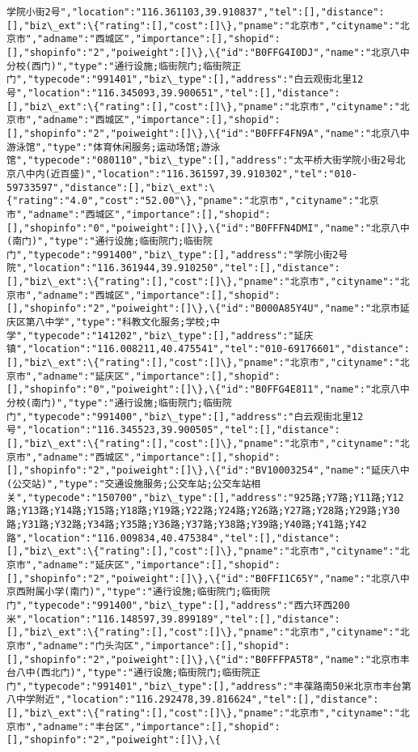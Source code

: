 \documentclass[11pt]{article}
\begin{document}
\begin{Verbatim}[commandchars=\\\{\}]
学院小街2号","location":"116.361103,39.910837","tel":[],"distance":[],"biz\_ext":\{"rating":[],"cost":[]\},"pname":"北京市","cityname":"北京市","adname":"西城区","importance":[],"shopid":[],"shopinfo":"2","poiweight":[]\},\{"id":"B0FFG4I0DJ","name":"北京八中分校(西门)","type":"通行设施;临街院门;临街院正门","typecode":"991401","biz\_type":[],"address":"白云观街北里12号","location":"116.345093,39.900651","tel":[],"distance":[],"biz\_ext":\{"rating":[],"cost":[]\},"pname":"北京市","cityname":"北京市","adname":"西城区","importance":[],"shopid":[],"shopinfo":"2","poiweight":[]\},\{"id":"B0FFF4FN9A","name":"北京八中游泳馆","type":"体育休闲服务;运动场馆;游泳馆","typecode":"080110","biz\_type":[],"address":"太平桥大街学院小街2号北京八中内(近百盛)","location":"116.361597,39.910302","tel":"010-59733597","distance":[],"biz\_ext":\{"rating":"4.0","cost":"52.00"\},"pname":"北京市","cityname":"北京市","adname":"西城区","importance":[],"shopid":[],"shopinfo":"0","poiweight":[]\},\{"id":"B0FFFN4DMI","name":"北京八中(南门)","type":"通行设施;临街院门;临街院门","typecode":"991400","biz\_type":[],"address":"学院小街2号院","location":"116.361944,39.910250","tel":[],"distance":[],"biz\_ext":\{"rating":[],"cost":[]\},"pname":"北京市","cityname":"北京市","adname":"西城区","importance":[],"shopid":[],"shopinfo":"2","poiweight":[]\},\{"id":"B000A85Y4U","name":"北京市延庆区第八中学","type":"科教文化服务;学校;中学","typecode":"141202","biz\_type":[],"address":"延庆镇","location":"116.008211,40.475541","tel":"010-69176601","distance":[],"biz\_ext":\{"rating":[],"cost":[]\},"pname":"北京市","cityname":"北京市","adname":"延庆区","importance":[],"shopid":[],"shopinfo":"0","poiweight":[]\},\{"id":"B0FFG4E811","name":"北京八中分校(南门)","type":"通行设施;临街院门;临街院门","typecode":"991400","biz\_type":[],"address":"白云观街北里12号","location":"116.345523,39.900505","tel":[],"distance":[],"biz\_ext":\{"rating":[],"cost":[]\},"pname":"北京市","cityname":"北京市","adname":"西城区","importance":[],"shopid":[],"shopinfo":"2","poiweight":[]\},\{"id":"BV10003254","name":"延庆八中(公交站)","type":"交通设施服务;公交车站;公交车站相关","typecode":"150700","biz\_type":[],"address":"925路;Y7路;Y11路;Y12路;Y13路;Y14路;Y15路;Y18路;Y19路;Y22路;Y24路;Y26路;Y27路;Y28路;Y29路;Y30路;Y31路;Y32路;Y34路;Y35路;Y36路;Y37路;Y38路;Y39路;Y40路;Y41路;Y42路","location":"116.009834,40.475384","tel":[],"distance":[],"biz\_ext":\{"rating":[],"cost":[]\},"pname":"北京市","cityname":"北京市","adname":"延庆区","importance":[],"shopid":[],"shopinfo":"2","poiweight":[]\},\{"id":"B0FFI1C65Y","name":"北京八中京西附属小学(南门)","type":"通行设施;临街院门;临街院门","typecode":"991400","biz\_type":[],"address":"西六环西200米","location":"116.148597,39.899189","tel":[],"distance":[],"biz\_ext":\{"rating":[],"cost":[]\},"pname":"北京市","cityname":"北京市","adname":"门头沟区","importance":[],"shopid":[],"shopinfo":"2","poiweight":[]\},\{"id":"B0FFFPA5T8","name":"北京市丰台八中(西北门)","type":"通行设施;临街院门;临街院正门","typecode":"991401","biz\_type":[],"address":"丰葆路南50米北京市丰台第八中学附近","location":"116.292478,39.816624","tel":[],"distance":[],"biz\_ext":\{"rating":[],"cost":[]\},"pname":"北京市","cityname":"北京市","adname":"丰台区","importance":[],"shopid":[],"shopinfo":"2","poiweight":[]\},\{
\end{Verbatim}
\end{document}
